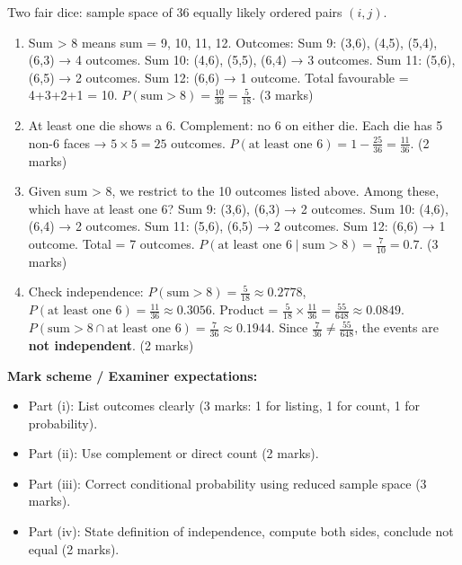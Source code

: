 \documentclass[11pt]{article}
\begin{document}
\begin{corrige}
Two fair dice: sample space of 36 equally likely ordered pairs $(i,j)$.
\begin{enumerate}
\item Sum > 8 means sum = 9, 10, 11, 12.
Outcomes:
Sum 9: (3,6), (4,5), (5,4), (6,3) → 4 outcomes.
Sum 10: (4,6), (5,5), (6,4) → 3 outcomes.
Sum 11: (5,6), (6,5) → 2 outcomes.
Sum 12: (6,6) → 1 outcome.
Total favourable = 4+3+2+1 = 10.
$P(\text{sum}>8) = \frac{10}{36} = \frac{5}{18}$. \hfill (3 marks)
\item At least one die shows a 6.
Complement: no 6 on either die. Each die has 5 non-6 faces → $5 \times 5 = 25$ outcomes.
$P(\text{at least one 6}) = 1 - \frac{25}{36} = \frac{11}{36}$. \hfill (2 marks)
\item Given sum > 8, we restrict to the 10 outcomes listed above. Among these, which have at least one 6?
Sum 9: (3,6), (6,3) → 2 outcomes.
Sum 10: (4,6), (6,4) → 2 outcomes.
Sum 11: (5,6), (6,5) → 2 outcomes.
Sum 12: (6,6) → 1 outcome.
Total = 7 outcomes.
$P(\text{at least one 6} \mid \text{sum}>8) = \frac{7}{10} = 0.7$. \hfill (3 marks)
\item Check independence: $P(\text{sum}>8) = \frac{5}{18} \approx 0.2778$, $P(\text{at least one 6}) = \frac{11}{36} \approx 0.3056$.
Product = $\frac{5}{18} \times \frac{11}{36} = \frac{55}{648} \approx 0.0849$.
$P(\text{sum}>8 \cap \text{at least one 6}) = \frac{7}{36} \approx 0.1944$.
Since $\frac{7}{36} \neq \frac{55}{648}$, the events are \textbf{not independent}. \hfill (2 marks)
\end{enumerate}
\textbf{Mark scheme / Examiner expectations:}
\begin{itemize}
\item Part (i): List outcomes clearly (3 marks: 1 for listing, 1 for count, 1 for probability).
\item Part (ii): Use complement or direct count (2 marks).
\item Part (iii): Correct conditional probability using reduced sample space (3 marks).
\item Part (iv): State definition of independence, compute both sides, conclude not equal (2 marks).
\end{itemize}
\end{corrige}
\end{document}
